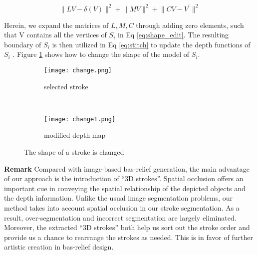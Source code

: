 \begin{equation}
\lVert LV-\delta(V) \rVert ^2 + \lVert MV \rVert^2 + \lVert CV-V^{'} \rVert ^2 
\label{eq:shape_edit}
\end{equation}
 
Herein, we expand the matrices of $L,M,C$ through adding zero elements, such that V contains all the vertices of $S_i$ in Eq \ref{eq:shape_edit}. The resulting boundary of $S_i$ is then utilized in Eq \ref{eq:stitch} to update the depth functions of $S_i$ . Figure \ref{shape_edit} shows how to change the shape of the model of $S_i$. \newline 

\begin{figure}[H]
	\centering
	\begin{subfigure}[b]{0.3\textwidth}
		\texttt{[image: change.png]}
		\caption{selected stroke}
		
	\end{subfigure}
	~  
	\begin{subfigure}[b]{0.3\textwidth}
		\texttt{[image: change1.png]}
		\caption{modified depth map}
		
	\end{subfigure}
	\caption{The shape of a stroke is changed}
	\label{shape_edit}
\end{figure}

\textbf{Remark} Compared with image-based bas-relief generation, the main advantage of our approach is the introduction of “3D strokes”. Spatial occlusion offers an important cue in conveying the spatial relationship of the depicted objects and the depth information. Unlike the usual image segmentation problems, our method takes into account spatial occlusion in our stroke segmentation. As a result, over-segmentation and incorrect segmentation are largely eliminated. Moreover, the extracted “3D strokes” both help us sort out the stroke order and provide us a chance to rearrange the strokes as needed. This is in favor of further artistic creation in bas-relief design.





